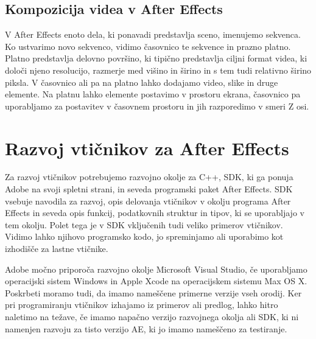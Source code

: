 \documentclass[a4paper, 12pt]{book}
\begin{document}


\section{Kompozicija videa v After Effects}

V After Effects enoto dela, ki ponavadi predstavlja sceno, imenujemo sekvenca\cite{aeclassroom}.
Ko ustvarimo novo sekvenco, vidimo časovnico te sekvence in prazno platno.
Platno predstavlja delovno površino, ki tipično predstavlja ciljni format videa, ki določi njeno resolucijo, razmerje med višino in širino in s tem tudi relativno širino piksla.
V časovnico ali pa na platno lahko dodajamo video, slike in druge elemente.
Na platnu lahko elemente postavimo v prostoru ekrana,
časovnico pa uporabljamo za postavitev v časovnem prostoru in jih razporedimo v smeri Z osi.








\chapter{Razvoj vtičnikov za After Effects}

Za razvoj vtičnikov potrebujemo razvojno okolje za C++, SDK, ki ga ponuja Adobe na svoji spletni strani, in seveda programski paket After Effects. 
SDK vsebuje navodila za razvoj, opis delovanja vtičnikov v okolju programa After Effects in seveda opis funkcij, podatkovnih struktur in tipov, ki se uporabljajo v tem okolju. 
Polet tega je v SDK vključenih tudi veliko primerov vtičnikov. 
Vidimo lahko njihovo programsko kodo, jo spreminjamo ali uporabimo kot izhodišče za lastne vtičnike.

Adobe močno priporoča razvojno okolje Microsoft Visual Studio, če uporabljamo operacijski sistem Windows in Apple Xcode na operacijskem sistemu Max OS X. 
Poskrbeti moramo tudi, da imamo nameščene primerne verzije vseh orodij. 
Ker pri programiranju vtičnikov izhajamo iz primerov ali predlog, lahko hitro naletimo na težave, če imamo napačno verzijo razvojnega okolja ali SDK, ki ni namenjen razvoju za tisto verzijo AE, ki jo imamo nameščeno za testiranje.
\end{document}
